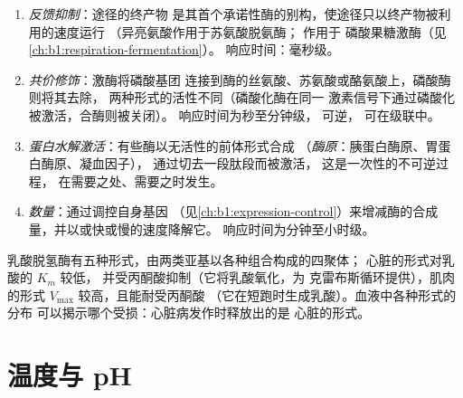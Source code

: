 \begin{proposition}[细胞控制酶的四种方式]\label{prop:b1:enzymes:control}
\begin{enumerate}
  \item \emph{反馈抑制}：途径的终产物
        是其首个承诺性酶的别构，使途径只以终产物被利用的速度运行
        （异亮氨酸作用于苏氨酸脱氨酶；
         作用于
        磷酸果糖激酶（见\cref{ch:b1:respiration-fermentation}）。
        响应时间：毫秒级。
  \item \emph{共价修饰}：激酶将磷酸基团
        连接到酶的丝氨酸、苏氨酸或酪氨酸上，磷酸酶则将其去除，
        两种形式的活性不同（磷酸化酶在同一
        激素信号下通过磷酸化被激活，合酶则被关闭）。
        响应时间为秒至分钟级，
        可逆，
        可在级联中。
  \item \emph{蛋白水解激活}：有些酶以无活性的前体形式合成
        （\emph{酶原}：胰蛋白酶原、胃蛋白酶原、凝血因子），
        通过切去一段肽段而被激活，
        这是一次性的不可逆过程，
        在需要之处、需要之时发生。
  \item \emph{数量}：通过调控自身基因
        （见\cref{ch:b1:expression-control}）来增减酶的合成量，并以或快或慢的速度降解它。
        响应时间为分钟至小时级。
\end{enumerate}
\end{proposition}

\begin{example}[同工酶]\label{ex:b1:enzymes:isoenzymes}
乳酸脱氢酶有五种形式，由两类亚基以各种组合构成的四聚体；
心脏的形式对乳酸的 $K_m$ 较低，
并受丙酮酸抑制（它将乳酸氧化，为
克雷布斯循环提供），肌肉的形式 $V_{\max}$ 较高，且能耐受丙酮酸
（它在短跑时生成乳酸）。血液中各种形式的分布
可以揭示哪个受损：心脏病发作时释放出的是
心脏的形式。
\end{example}

\section{温度与 pH}

